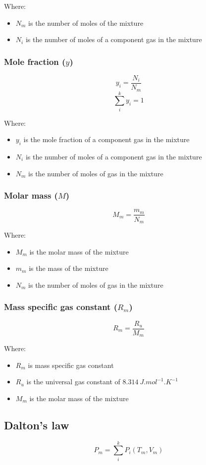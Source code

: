 \documentclass[11pt]{article}
\begin{document}
Where:
\begin{itemize}
\item \(N_m\) is the number of moles of the mixture
\item \(N_i\) is the number of moles of a component gas in the mixture
\end{itemize}

 \newpage
\subsubsection{Mole fraction (\(y\))}
\label{sec:orga71fb18}
\[y_i = \frac{N_i}{N_m}\]
\[\sum_i^k y_i = 1\]

Where:
\begin{itemize}
\item \(y_i\) is the mole fraction of a component gas in the mixture
\item \(N_i\) is the number of moles of a component gas in the mixture
\item \(N_m\) is the number of moles of gas in the mixture
\end{itemize}
\subsubsection{Molar mass (\(M\))}
\label{sec:org5bea6fc}
\[M_m = \frac{m_m}{N_m}\]

Where:
\begin{itemize}
\item \(M_m\) is the molar mass of the mixture
\item \(m_m\) is the mass of the mixture
\item \(N_m\) is the number of moles of gas in the mixture
\end{itemize}
\subsubsection{Mass specific gas constant (\(R_m\))}
\label{sec:org99ef2aa}
\[R_m = \frac{R_u}{M_m}\]

Where:
\begin{itemize}
\item \(R_m\) is mass specific gas constant
\item \(R_u\) is the universal gas constant of \(\qty{8.314}{J.mol^{-1}.K^{-1}}\)
\item \(M_m\) is the molar mass of the mixture
\end{itemize}
\subsection{Dalton's law}
\label{sec:org9fc40c7}
\[P_m = \sum_i^k P_i (T_m, V_m)\]
\end{document}
